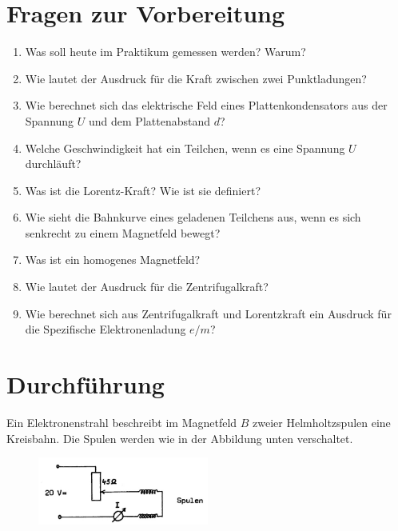 

\section{Fragen zur Vorbereitung}

\begin{enumerate}
	\item Was soll heute im Praktikum gemessen werden? Warum?
	\item Wie lautet der Ausdruck für die Kraft zwischen zwei Punktladungen?
	\item Wie berechnet sich das elektrische Feld eines Plattenkondensators aus der Spannung $U$ und dem Plattenabstand $d$?
	\item Welche Geschwindigkeit hat ein Teilchen, wenn es eine Spannung $U$ durchläuft?
	\item Was ist die Lorentz-Kraft? Wie ist sie definiert?
	\item Wie sieht die Bahnkurve eines geladenen Teilchens aus, wenn es sich senkrecht zu einem Magnetfeld bewegt?
	\item Was ist ein homogenes Magnetfeld?
	\item Wie lautet der Ausdruck für die Zentrifugalkraft?
	\item Wie berechnet sich aus Zentrifugalkraft und Lorentzkraft ein Ausdruck für die Spezifische Elektronenladung $e/m$?
\end{enumerate}

\section{Durchführung} 

Ein Elektronenstrahl beschreibt im Magnetfeld $B$ zweier Helmholtzspulen eine Kreisbahn. Die Spulen werden wie in der Abbildung unten verschaltet.

\begin{figure}[h]
	\centering
		\includegraphics[width=0.50\textwidth]{Versuch_19-20/Abbildungen/Schaltung-HHSpulen.jpg}
	\label{fig:Schaltung-HHSpulen}
\end{figure}

